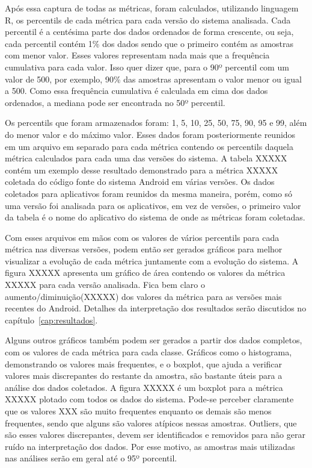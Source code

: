 Após essa captura de todas as métricas, foram calculados, utilizando linguagem R, os percentils de cada métrica para cada versão do sistema analisada. Cada percentil é a centésima parte dos dados ordenados de forma crescente, ou seja, cada percentil contém 1\% dos dados sendo que o primeiro contém as amostras com menor valor. Esses valores representam nada mais que a frequência cumulativa para cada valor. Isso quer dizer que, para o 90º percentil com um valor de 500, por exemplo, 90\% das amostras apresentam o valor menor ou igual a 500. Como essa frequência cumulativa é calculada em cima dos dados ordenados, a mediana pode ser encontrada no 50º percentil.

Os percentils que foram armazenados foram: 1, 5, 10, 25, 50, 75, 90, 95 e 99, além do menor valor e do máximo valor. Esses dados foram posteriormente reunidos em um arquivo em separado para cada métrica contendo os percentils daquela métrica calculados para cada uma das versões do sistema. A tabela XXXXX contém um exemplo desse resultado demonstrado para a métrica XXXXX coletada do código fonte do sistema Android em várias versões. Os dados coletados para aplicativos foram reunidos da mesma maneira, porém, como só uma versão foi analisada para os aplicativos, em vez de versões, o primeiro valor da tabela é o nome do aplicativo do sistema de onde as métricas foram coletadas.


Com esses arquivos em mãos com os valores de vários percentils para cada métrica nas diversas versões, podem então ser gerados gráficos para melhor visualizar a evolução de cada métrica juntamente com a evolução do sistema. A figura XXXXX apresenta um gráfico de área contendo os valores da métrica XXXXX para cada versão analisada. Fica bem claro o aumento/diminuição(XXXXX) dos valores da métrica para as versões mais recentes do Android. Detalhes da interpretação dos resultados serão discutidos no capítulo~\ref{cap:resultados}.


Alguns outros gráficos também podem ser gerados a partir dos dados completos, com os valores de cada métrica para cada classe. Gráficos como o histograma, demonstrando os valores mais frequentes, e o boxplot, que ajuda a verificar valores mais discrepantes do restante da amostra, são bastante úteis para a análise dos dados coletados. A figura XXXXX é um boxplot para a métrica XXXXX plotado com todos os dados do sistema. Pode-se perceber claramente que os valores XXX são muito frequentes enquanto os demais são menos frequentes, sendo que alguns são valores atípicos nessas amostras. Outliers, que são esses valores discrepantes, devem ser identificados e removidos para não gerar ruído na interpretação dos dados. Por esse motivo, as amostras mais utilizadas nas análises serão em geral até o 95º porcentil.  %


